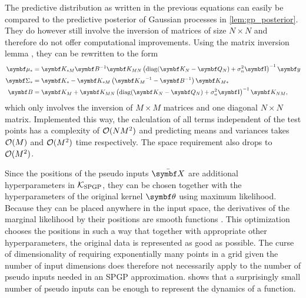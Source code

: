 The predictive distribution as written in the previous equations can easily be compared to the predictive posterior of Gaussian processes in \cref{lem:gp_posterior}.
They do however still involve the inversion of matrices of size $N \times N$ and therefore do not offer computational improvements.
Using the matrix inversion lemma \cite{petersen_matrix_2008}, they can be rewritten to the form
\begin{align}
    \begin{split}
        \mat{\mu_\ast} &= \mat{K_{\ast M}} \mat{B}^{-1} \mat{K_{MN}} \left( \diag(\mat{K_N} - \mat{Q_N}) + \sigma_n^2 \Eye \right)^{-1} \mat{y} \\
        \mat{\Sigma_\ast} &= \mat{K_\ast} - \mat{K_{\ast M}} \left( \mat{K_M}^{-1} - \mat{B}^{-1} \right) \mat{K_{M \ast}}\vphantom{\left(\mat{K_M}^{-1} \right)^{-1}} \\
        \mat{B} &= \mat{K_M} + \mat{K_{MN}} \left( \diag(\mat{K_N} - \mat{Q_N}) + \sigma_n^2 \Eye \right)^{-1} \mat{K_{NM}},
    \end{split}
\end{align}
which only involves the inversion of $M \times M$ matrices and one diagonal $N \times N$ matrix.
Implemented this way, the calculation of all terms independent of the test points has a complexity of $\operatorname{\mathcal{O}}(NM^2)$ and predicting means and variances takes $\operatorname{\mathcal{O}}(M)$ and $\operatorname{\mathcal{O}}(M^2)$ time respectively.
The space requirement also drops to $\operatorname{\mathcal{O}}(M^2)$.

Since the positions of the pseudo inputs $\ps{\mat{X}}$ are additional hyperparameters in $\operatorname{\mathcal{K}}_{\text{SPGP}}$, they can be chosen together with the hyperparameters of the original kernel $\mat{\theta}$ using maximum likelihood.
Because they can be placed anywhere in the input space, the derivatives of the marginal likelihood by their positions are smooth functions \cite{snelson_sparse_2005}.
This optimization chooses the positions in such a way that together with appropriate other hyperparameters, the original data is represented as good as possible.
The curse of dimensionality of requiring exponentially many points in a grid given the number of input dimensions does therefore not necessarily apply to the number of pseudo inputs needed in an SPGP approximation.
 shows that a surprisingly small number of pseudo inputs can be enough to represent the dynamics of a function.

